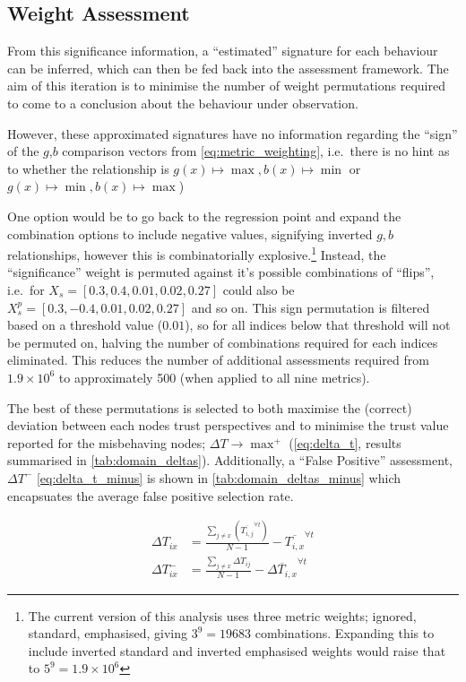 \subsection{Weight Assessment}\label{sec:weight_assessment}

From this significance information, a ``estimated'' signature for each behaviour can be inferred, which can then be fed back into the assessment framework. 
The aim of this iteration is to minimise the number of weight permutations required to come to a conclusion about the behaviour under observation. 

However, these approximated signatures have no information regarding the ``sign'' of the  $g$,$b$ comparison vectors from \eqref{eq:metric_weighting}, i.e.\ there is no hint as to whether the relationship is $g(x) \mapsto \max, b(x) \mapsto \min$ or $g(x) \mapsto \min, b(x) \mapsto \max$)  

One option would be to go back to the regression point and expand the combination options to include negative values, signifying inverted $g,b$ relationships, however this is combinatorially explosive.\footnote{The current version of this analysis uses three metric weights; ignored, standard, emphasised, giving $3^9 = 19683$ combinations. Expanding this to include inverted standard and inverted emphasised weights would raise that to $5^9 = 1.9\times 10^6$}
Instead, the ``significance'' weight is permuted against it's possible combinations of ``flips'', i.e.\ for $X_s=[0.3,0.4,0.01,0.02,0.27]$ could also be $X_s^p=[0.3,-0.4,0.01,0.02,0.27]$ and so on. 
This sign permutation is filtered based on a threshold value ($0.01$), so for all indices below that threshold will not be permuted on, halving the number of combinations required for each indices eliminated.
This reduces the number of additional assessments required from $1.9\times 10^6$ to approximately 500 (when applied to all nine metrics).

The best of these permutations is selected to both maximise the (correct) deviation between each nodes trust perspectives and to minimise the trust value reported for the misbehaving nodes; $\Delta T \to \max^+$ (\autoref{eq:delta_t}, results summarised in \autoref{tab:domain_deltas}).
Additionally, a ``False Positive'' assessment, $\Delta T^-$ \autoref{eq:delta_t_minus} is shown in \autoref{tab:domain_deltas_minus} which encapsuates the average false positive selection rate.

\begin{align}
  \Delta T_{ix} &= \frac{\sum_{j\neq x}\left( \overline{T_{i,j}}^{\forall t}\right)}{N-1} - \overline{T_{i,x}}^{\forall t} \label{eq:delta_t}\\
  \Delta T_{ix}^- &= \frac{\sum_{j\neq x} \Delta T_{ij}}{N-1} - \overline{\Delta T_{i,x}}^{\forall t} \label{eq:delta_t_minus} 
\end{align}

